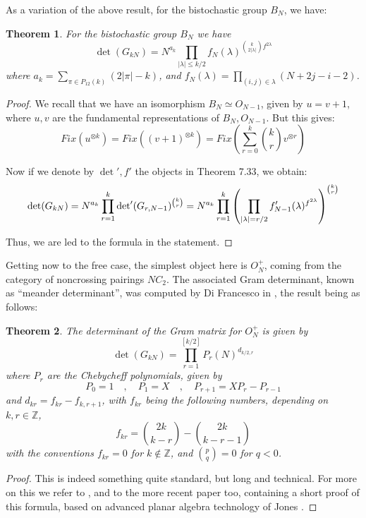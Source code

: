 \documentclass[12pt]{amsbook}
\newtheorem{theorem}{Theorem}[chapter]
\begin{document}
As a variation of the above result, for the bistochastic group $B_N$, we have:


\begin{theorem}
For the bistochastic group $B_N$ we have
$$\det(G_{kN})=N^{a_k}\prod_{|\lambda|\leq k/2}f_N(\lambda)^{\binom{k}{2|\lambda|}f^{2\lambda}}$$
where $a_k=\sum_{\pi\in P_{12}(k)}(2|\pi|-k)$, and $f_N(\lambda)=\prod_{(i,j)\in\lambda}(N+2j-i-2)$.
\end{theorem}

\begin{proof}
We recall that we have an isomorphism $B_N\simeq O_{N-1}$, given by $u=v+1$, where $u,v$ are the fundamental representations of $B_N,O_{N-1}$. But this gives:
$$Fix(u^{\otimes k})
=Fix\left((v+1)^{\otimes k}\right)
=Fix\left(\sum_{r=0}^k\binom{k}{r}v^{\otimes r}\right)$$

Now if we denote by $\det',f'$ the objects in Theorem 7.33, we obtain:
$$\det(G_{kN})
=N^{a_k}\prod_{r=1}^k{\rm det}'(G_{r,N-1})^{\binom{k}{r}}
=N^{a_k}\prod_{r=1}^k\left(\prod_{|\lambda|=r/2}f'_{N-1}(\lambda)^{f^{2\lambda}}\right)^{\binom{k}{r}}$$

Thus, we are led to the formula in the statement.
\end{proof}

Getting now to the free case, the simplest object here is $O_N^+$, coming from the category of noncrossing pairings $NC_2$. The associated Gram determinant, known as ``meander determinant'', was computed by Di Francesco in \cite{dif}, the result being as follows:


\begin{theorem}
The determinant of the Gram matrix for $O_N^+$ is given by
$$\det(G_{kN})=\prod_{r=1}^{[k/2]}P_r(N)^{d_{k/2,r}}$$
where $P_r$ are the Chebycheff polynomials, given by
$$P_0=1\quad,\quad 
P_1=X\quad,\quad 
P_{r+1}=XP_r-P_{r-1}$$
and $d_{kr}=f_{kr}-f_{k,r+1}$, with $f_{kr}$ being the following numbers, depending on $k,r\in\mathbb Z$,
$$f_{kr}=\binom{2k}{k-r}-\binom{2k}{k-r-1}$$
with the conventions $f_{kr}=0$ for $k\notin\mathbb Z$, and $\binom{p}{q}=0$ for $q<0$. 
\end{theorem}

\begin{proof}
This is indeed something quite standard, but long and technical. For more on this we refer to \cite{dif}, and to the more recent paper \cite{bcu} too, containing a short proof of this formula, based on advanced planar algebra technology of Jones \cite{jo3}.
\end{proof}
\end{document}
